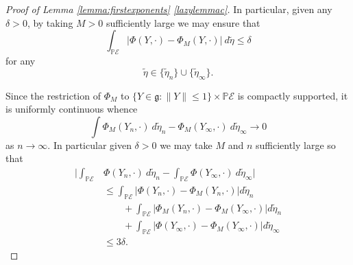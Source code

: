 \documentclass[10pt,reqno]{amsart}
\theoremstyle{Theorem}
\theoremstyle{definition}
\theoremstyle{remark}
\newcommand{\td}{\tilde}
\def\calE{\mathcal E}
\newcommand{\lieg}{\mathfrak g}
\renewcommand\P{\mathbb{P}}
\begin{document}
\begin{proof}[Proof of Lemma \ref{lemma:firstexponents} \ref{lazylemmac}]
In particular, given any $\delta>0$, by taking $M>0$ sufficiently large we may ensure that $$\int_{ \P\calE} |\Phi(Y, \cdot ) - \Phi_M(Y, \cdot )| \ d  \td  \eta\le \delta$$ for any   $$\td  \eta\in  \{\td \eta_n\} \cup\{\td \eta_\infty\}.$$

Since   the restriction of $\Phi_M$ to $\{ Y\in \lieg : \|Y\|\le 1\} \times \P\calE$ is compactly supported, it is uniformly continuous whence
$$\int  \Phi_M(Y_n, \cdot ) \ d \td \eta_n - \Phi_M(Y_\infty, \cdot )\ d \td \eta_\infty \to 0$$
as $n\to \infty.$
In particular given $\delta>0$ we may take $M$ and $n$ sufficiently large so that
\begin{align*}
\Big|\int_{ \P\calE}  &\Phi(Y_n, \cdot ) \ d \td \eta_n  - \int _{\P \calE} \Phi(Y_\infty, \cdot )  \ d \td  \eta_\infty\Big|
\\&\le  \int_{ \P\calE}  \left|  \Phi(Y_n, \cdot ) - \Phi_M(Y_n, \cdot ) \right |d \td \eta_n\\
&\quad \quad + \int_{ \P\calE}  \left|   \Phi_M(Y_n, \cdot ) - \Phi_M(Y_\infty, \cdot )\right |d \td \eta_n\\
&\quad \quad +  \int_{ \P\calE}  \left|  \Phi(Y_\infty, \cdot ) - \Phi_M(Y_\infty, \cdot ) \right |d \td \eta_\infty\\
&\le 3\delta.
\end{align*}


\end{proof}
\end{document}
